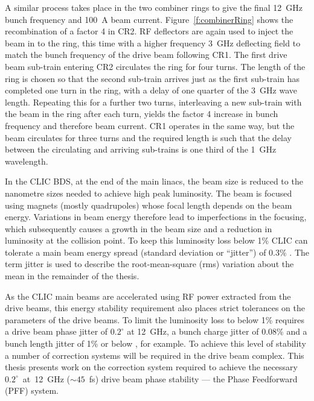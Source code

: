 A similar process takes place in the two combiner rings to give the final 12~GHz bunch frequency and 100~A beam current. Figure~\ref{f:combinerRing} shows the recombination of a factor 4 in CR2. RF deflectors are again used to inject the beam in to the ring, this time with a higher frequency 3~GHz deflecting field to match the bunch frequency of the drive beam following CR1. The first drive beam sub-train entering CR2 circulates the ring for four turns. The length of the ring is chosen so that the second sub-train arrives just as the first sub-train has completed one turn in the ring, with a delay of one quarter of the 3~GHz wave length. Repeating this for a further two turns, interleaving a new sub-train with the beam in the ring after each turn, yields the factor 4 increase in bunch frequency and therefore beam current. CR1 operates in the same way, but the beam circulates for three turns and the required length is such that the delay between the circulating and arriving sub-trains is one third of the 1~GHz wavelength.


In the CLIC BDS, at the end of the main linacs, the beam size is reduced to the nanometre sizes needed to achieve high peak luminosity. The beam is focused using magnets (mostly quadrupoles) whose focal length depends on the beam energy. Variations in beam energy therefore lead to imperfections in the focusing, which subsequently causes a growth in the beam size and a reduction in luminosity at the collision point. To keep this luminosity loss below 1\% CLIC can tolerate a main beam energy spread (standard deviation or ``jitter'') of 0.3\% \cite{clicCDR}. The term jitter is used to describe the root-mean-square (rms) variation about the mean in the remainder of the thesis. 

As the CLIC main beams are accelerated using RF power extracted from the drive beams, this energy stability requirement also places strict tolerances on the parameters of the drive beams. To limit the luminosity loss to below 1\% requires a drive beam phase jitter of \(0.2^\circ\) at 12~GHz, a bunch charge jitter of 0.08\% and a bunch length jitter of 1\% or below \cite{clicStabReq}, for example. To achieve this level of stability a number of correction systems will be required in the drive beam complex. This thesis presents work on the correction system required to achieve the necessary \(0.2^\circ\)~at~12~GHz (\(\sim45\)~fs) drive beam phase stability --- the Phase Feedforward (PFF) system.


